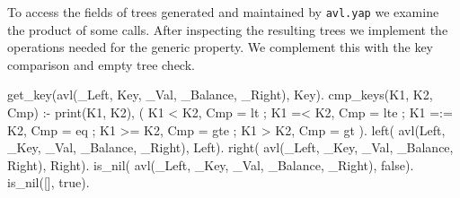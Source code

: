 \documentclass[11pt]{article}
\newcommand{\yap}[1]{\lstinline[style=yap]{#1}}
\begin{document}
To access the fields of trees generated and maintained by \yap{avl.yap}
we examine the product of some calls.
%
After inspecting the resulting trees we implement the operations needed
for the generic property.
%
We complement this with the key comparison and empty tree check.
%
\begin{yapcode}
 get_key(avl(_Left, Key, _Val,
             _Balance, _Right), Key).
 cmp_keys(K1, K2, Cmp) :-
   print({K1, K2}),
 ( K1 < K2, Cmp = lt
 ; K1 =< K2, Cmp = lte
 ; K1 =:= K2, Cmp = eq
 ; K1 >= K2, Cmp = gte
 ; K1 > K2, Cmp = gt
 ).
 left( avl(Left, _Key, _Val,
           _Balance, _Right), Left).
 right( avl(_Left, _Key, _Val,
            _Balance, Right), Right).
 is_nil( avl(_Left, _Key, _Val,
             _Balance, _Right), false).
 is_nil([], true).
\end{yapcode}

\end{document}
